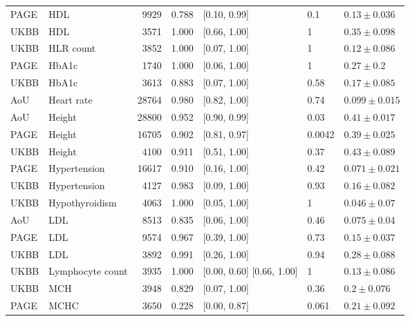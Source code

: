 \begin{tabular}{llrrlll}
 PAGE &                      HDL &  9929 & 0.788 &              [0.10, 0.99] &     0.1 &   $0.13 \pm 0.036$ \\
 UKBB &                      HDL &  3571 & 1.000 &              [0.66, 1.00] &       1 &   $0.35 \pm 0.098$ \\
 UKBB &                HLR count &  3852 & 1.000 &              [0.07, 1.00] &       1 &   $0.12 \pm 0.086$ \\
 PAGE &                    HbA1c &  1740 & 1.000 &              [0.06, 1.00] &       1 &     $0.27 \pm 0.2$ \\
 UKBB &                    HbA1c &  3613 & 0.883 &              [0.07, 1.00] &    0.58 &   $0.17 \pm 0.085$ \\
  AoU &               Heart rate & 28764 & 0.980 &              [0.82, 1.00] &    0.74 &  $0.099 \pm 0.015$ \\
  AoU &                   Height & 28800 & 0.952 &              [0.90, 0.99] &    0.03 &   $0.41 \pm 0.017$ \\
 PAGE &                   Height & 16705 & 0.902 &              [0.81, 0.97] &  0.0042 &   $0.39 \pm 0.025$ \\
 UKBB &                   Height &  4100 & 0.911 &              [0.51, 1.00] &    0.37 &   $0.43 \pm 0.089$ \\
 PAGE &             Hypertension & 16617 & 0.910 &              [0.16, 1.00] &    0.42 &  $0.071 \pm 0.021$ \\
 UKBB &             Hypertension &  4127 & 0.983 &              [0.09, 1.00] &    0.93 &   $0.16 \pm 0.082$ \\
 UKBB &           Hypothyroidism &  4063 & 1.000 &              [0.05, 1.00] &       1 &   $0.046 \pm 0.07$ \\
  AoU &                      LDL &  8513 & 0.835 &              [0.06, 1.00] &    0.46 &   $0.075 \pm 0.04$ \\
 PAGE &                      LDL &  9574 & 0.967 &              [0.39, 1.00] &    0.73 &   $0.15 \pm 0.037$ \\
 UKBB &                      LDL &  3892 & 0.991 &              [0.26, 1.00] &    0.94 &   $0.28 \pm 0.088$ \\
 UKBB &         Lymphocyte count &  3935 & 1.000 & [0.00, 0.60] [0.66, 1.00] &       1 &   $0.13 \pm 0.086$ \\
 UKBB &                      MCH &  3948 & 0.829 &              [0.07, 1.00] &    0.36 &    $0.2 \pm 0.076$ \\
 PAGE &                     MCHC &  3650 & 0.228 &              [0.00, 0.87] &   0.061 &   $0.21 \pm 0.092$ \\

\end{tabular}

